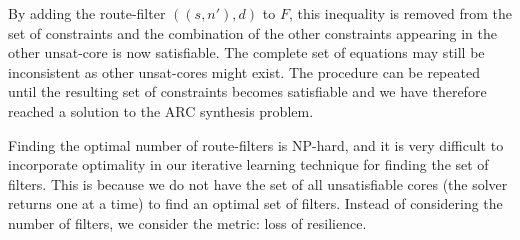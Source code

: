 By adding the route-filter $((s,n'),d)$ to $F$, this inequality is removed from the set of constraints
and the combination of the other constraints appearing in the other unsat-core is now satisfiable.
The complete set of equations may still be inconsistent as other unsat-cores might exist. 
The procedure can be repeated until the resulting set of constraints becomes satisfiable
and we have therefore reached a solution to the ARC synthesis problem.

Finding the optimal number of route-filters is NP-hard, and it
is very difficult to incorporate optimality in our iterative learning
technique for finding the set of filters. This is because we do not 
have the set of all unsatisfiable cores (the solver returns one at 
a time) to find an optimal set of filters. Instead of considering the 
number of filters, we consider the metric: loss of resilience.

